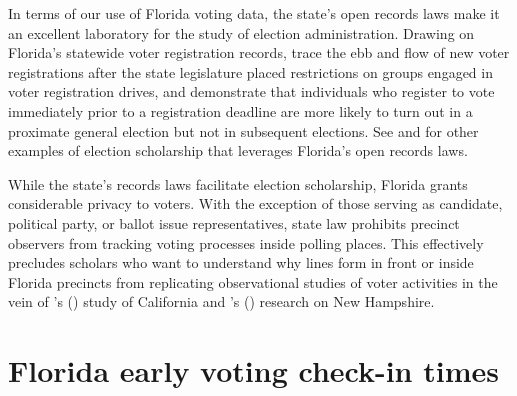 \documentclass[12pt,titlepage]{article}
\newcommand{\possessivecite}[1]{\citeauthor{#1}'s (\citeyear{#1})}
\begin{document}
In terms of our use of Florida voting data, the state's open records
laws make it an excellent laboratory for the study of election
administration. Drawing on Florida's statewide voter registration
records, \cite{herron_smith2013} trace the ebb and flow of new voter
registrations after the state legislature placed restrictions on
groups engaged in voter registration drives, and
\cite{shinosmith:registrationtiming} demonstrate that individuals who
register to vote immediately prior to a registration deadline are more
likely to turn out in a proximate general election but not in
subsequent elections.  See  \cite{amos_etal2017} and
\cite{herronsmith:closingtimes} for other examples of election
scholarship that leverages Florida's open records laws.






While the state's records laws facilitate election scholarship,
Florida grants considerable privacy to voters.  With the exception of
those serving as candidate, political party, or ballot issue
representatives, state law prohibits precinct observers from tracking
voting processes inside polling places. This effectively precludes
scholars who want to understand why lines form in front or inside
Florida precincts from replicating observational studies of voter
activities in the vein of \possessivecite{spencermarkovits:renege}
study of California and \possessivecite{herronsmith:hanoverstudy}
research on New Hampshire.

\section*{Florida early voting check-in times}
\end{document}
